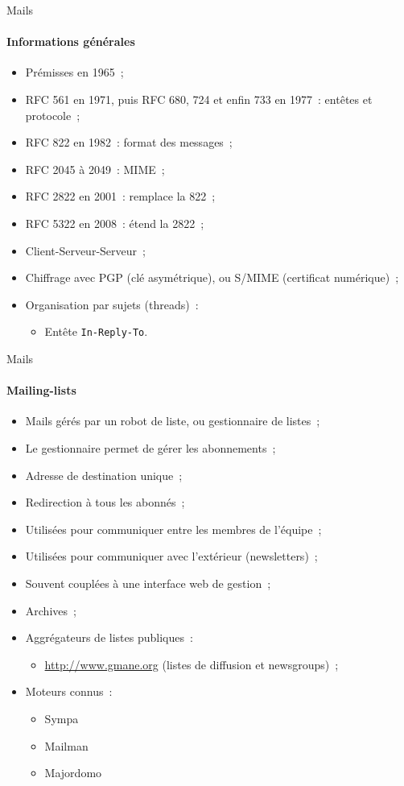 \begin{frame}[fragile]{Mails}
\framesubtitle{Informations générales}
\begin{itemize}
 \item Prémisses en 1965~;
 \pause
 \item RFC 561 en 1971, puis RFC 680, 724 et enfin 733 en 1977~: entêtes et protocole~;
 \pause
 \item RFC 822 en 1982~: format des messages~;
 \pause
 \item RFC 2045 à 2049~: MIME~;
 \pause
 \item RFC 2822 en 2001~: remplace la 822~;
 \pause
 \item RFC 5322 en 2008~: étend la 2822~;
 \pause
 \item Client-Serveur-Serveur~;
 \pause
 \item Chiffrage avec PGP (clé asymétrique), ou S/MIME (certificat numérique)~;
 \pause
 \item Organisation par sujets (threads)~:
 \begin{itemize}
  \pause
  \item Entête \verb/In-Reply-To/.
 \end{itemize}
\end{itemize}
\end{frame}

\begin{frame}{Mails}
\framesubtitle{Mailing-lists}
\begin{itemize}
 \item Mails gérés par un robot de liste, ou gestionnaire de listes~;
 \pause
 \item Le gestionnaire permet de gérer les abonnements~;
 \pause
 \item Adresse de destination unique~;
 \pause
 \item Redirection à tous les abonnés~;
 \pause
 \item Utilisées pour communiquer entre les membres de l'équipe~;
 \pause
 \item Utilisées pour communiquer avec l'extérieur (newsletters)~;
 \pause
 \item Souvent couplées à une interface web de gestion~;
 \pause
 \item Archives~;
 \pause
 \item Aggrégateurs de listes publiques~:
 \begin{itemize}
 \pause
  \item \url{http://www.gmane.org} (listes de diffusion et newsgroups)~;
 \end{itemize}

 \pause
 \item Moteurs connus~:
 \begin{itemize}
  \pause
  \item Sympa
  \pause
  \item Mailman
  \pause
  \item Majordomo
 \end{itemize}
\end{itemize}
\end{frame}

